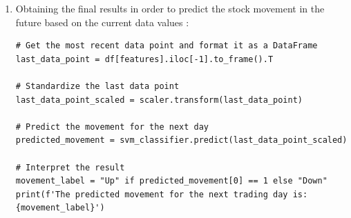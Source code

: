 \documentclass[12pt,a4paper]{report}
\begin{document}
\begin{enumerate}
\begin{verbatim}
# Confusion matrix
cm = confusion_matrix(y_test, y_pred)
print("Confusion Matrix:\n", cm)

# Accuracy, Precision, Recall, F1-score
accuracy = accuracy_score(y_test, y_pred)
precision = precision_score(y_test, y_pred)
recall = recall_score(y_test, y_pred)
f1 = f1_score(y_test, y_pred)

print(f'Accuracy: {accuracy:.2f}')
print(f'Precision: {precision:.2f}')
print(f'Recall: {recall:.2f}')
print(f'F1-Score: {f1:.2f}')

# Detailed classification report
print("\nClassification Report:\n", classification_report(y_test, 
y_pred))
\end{verbatim}

\item Obtaining the final results in order to predict the stock movement in the future based on the current data values :
    \begin{verbatim}
# Get the most recent data point and format it as a DataFrame
last_data_point = df[features].iloc[-1].to_frame().T

# Standardize the last data point
last_data_point_scaled = scaler.transform(last_data_point)

# Predict the movement for the next day
predicted_movement = svm_classifier.predict(last_data_point_scaled)

# Interpret the result
movement_label = "Up" if predicted_movement[0] == 1 else "Down"
print(f'The predicted movement for the next trading day is:
{movement_label}')

    \end{verbatim}
       
\end{enumerate}
\newpage
\end{document}
